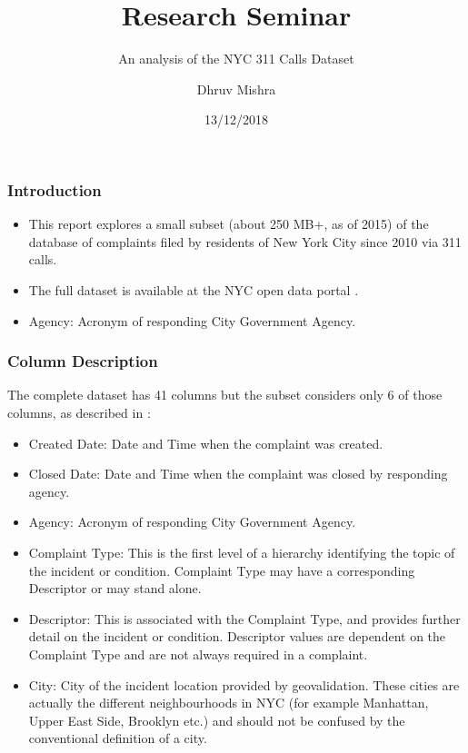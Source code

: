 \documentclass[10pt]{beamer}
\title{Research Seminar}
\subtitle{An analysis of the NYC 311 Calls Dataset}
\author{Dhruv Mishra}
\institute{Master of Science \textit{Computational Linguistics}\\
  Institut für Maschinelle Sprachverarbeitung\\
  Universität Stuttgart}
\date{13/12/2018}
\begin{document}
\frame{\titlepage}


\begin{frame} \frametitle{Introduction}

  \begin{itemize}
    \item This report explores a small subset (about 250 MB+, as of 2015) of the database of complaints filed by residents of New York City since 2010 via 311 calls.
    \item The full dataset is available at the NYC open data portal \cite{nycdatafull}.
    \item Agency: Acronym of responding City Government Agency.
\end{itemize}

\end{frame}

\begin{frame} \frametitle{Column Description}
The complete dataset has 41 columns but the subset considers only 6 of those columns, as described in \cite{nycdatafull}:

  \begin{itemize}
    \item Created Date: Date and Time when the complaint was created.
    \item Closed Date: Date and Time when the complaint was closed by responding agency.
    \item Agency: Acronym of responding City Government Agency.
    \item Complaint Type: This is the first level of a hierarchy identifying the topic of the incident or condition. Complaint Type may have a corresponding Descriptor or may stand alone.
    \item Descriptor: This is associated with the Complaint Type, and provides further detail on the incident or condition. Descriptor values are dependent on the Complaint Type and are not always required in a complaint.
    \item City: City of the incident location provided by geovalidation. These cities are actually the different neighbourhoods in NYC (for example Manhattan, Upper East Side, Brooklyn etc.) and should not be confused by the conventional definition of a city.
\end{itemize}

\end{frame}
\end{document}
